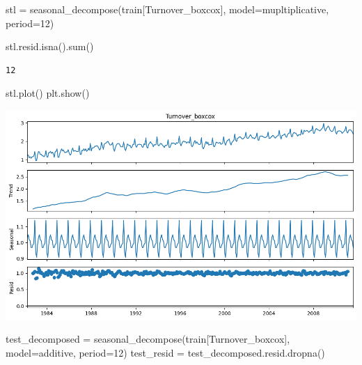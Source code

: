 \documentclass[
  11pt,
]{article}
\newenvironment{Shaded}{\begin{snugshade}}{\end{snugshade}}
\newcommand{\BuiltInTok}[1]{\textcolor[rgb]{0.00,0.23,0.31}{#1}}
\newcommand{\DecValTok}[1]{\textcolor[rgb]{0.68,0.00,0.00}{#1}}
\newcommand{\NormalTok}[1]{\textcolor[rgb]{0.00,0.23,0.31}{#1}}
\newcommand{\OperatorTok}[1]{\textcolor[rgb]{0.37,0.37,0.37}{#1}}
\newcommand{\StringTok}[1]{\textcolor[rgb]{0.13,0.47,0.30}{#1}}
\begin{document}
\begin{Shaded}
\begin{Highlighting}[]
\NormalTok{stl }\OperatorTok{=}\NormalTok{ seasonal\_decompose(train[}\StringTok{\textquotesingle{}Turnover\_boxcox\textquotesingle{}}\NormalTok{], model}\OperatorTok{=}\StringTok{\textquotesingle{}mupltiplicative\textquotesingle{}}\NormalTok{, period}\OperatorTok{=}\DecValTok{12}\NormalTok{) }
\end{Highlighting}
\end{Shaded}

\begin{Shaded}
\begin{Highlighting}[]
\NormalTok{stl.resid.isna().}\BuiltInTok{sum}\NormalTok{()}
\end{Highlighting}
\end{Shaded}

\begin{verbatim}
12
\end{verbatim}

\begin{Shaded}
\begin{Highlighting}[]
\NormalTok{stl.plot()}
\NormalTok{plt.show()}
\end{Highlighting}
\end{Shaded}

\includegraphics{hw5_files/figure-pdf/cell-60-output-1.png}

\begin{Shaded}
\begin{Highlighting}[]
\NormalTok{test\_decomposed }\OperatorTok{=}\NormalTok{ seasonal\_decompose(train[}\StringTok{\textquotesingle{}Turnover\_boxcox\textquotesingle{}}\NormalTok{], model}\OperatorTok{=}\StringTok{\textquotesingle{}additive\textquotesingle{}}\NormalTok{, period}\OperatorTok{=}\DecValTok{12}\NormalTok{)}
\NormalTok{test\_resid }\OperatorTok{=}\NormalTok{ test\_decomposed.resid.dropna()}
\end{Highlighting}
\end{Shaded}
\end{document}
